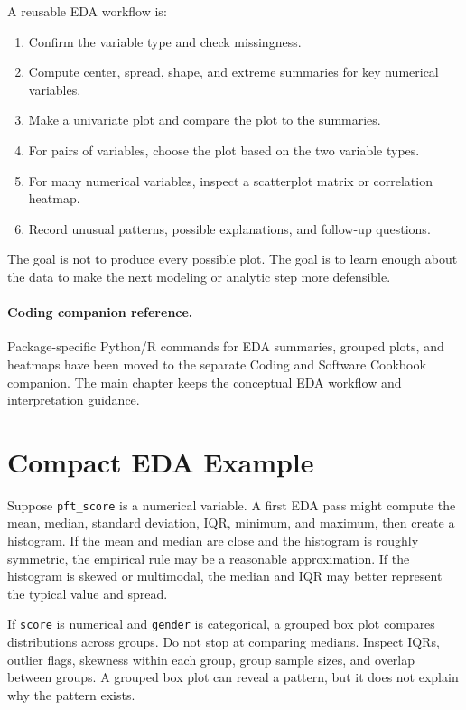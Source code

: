 {A reusable EDA workflow is:
\begin{enumerate}
  \item Confirm the variable type and check missingness.
  \item Compute center, spread, shape, and extreme summaries for key numerical variables.
  \item Make a univariate plot and compare the plot to the summaries.
  \item For pairs of variables, choose the plot based on the two variable types.
  \item For many numerical variables, inspect a scatterplot matrix or correlation heatmap.
  \item Record unusual patterns, possible explanations, and follow-up questions.
\end{enumerate}

The goal is not to produce every possible plot.  The goal is to learn enough about the data to make the next modeling or analytic step more defensible.

\paragraph{Coding companion reference.}
Package-specific Python/R commands for EDA summaries, grouped plots, and heatmaps have been moved to the separate Coding and Software Cookbook companion.  The main chapter keeps the conceptual EDA workflow and interpretation guidance.

\section{Compact EDA Example}

Suppose \texttt{pft\_score} is a numerical variable.  A first EDA pass might compute the mean, median, standard deviation, IQR, minimum, and maximum, then create a histogram.  If the mean and median are close and the histogram is roughly symmetric, the empirical rule may be a reasonable approximation.  If the histogram is skewed or multimodal, the median and IQR may better represent the typical value and spread.

If \texttt{score} is numerical and \texttt{gender} is categorical, a grouped box plot compares distributions across groups.  Do not stop at comparing medians.  Inspect IQRs, outlier flags, skewness within each group, group sample sizes, and overlap between groups.  A grouped box plot can reveal a pattern, but it does not explain why the pattern exists.

}
